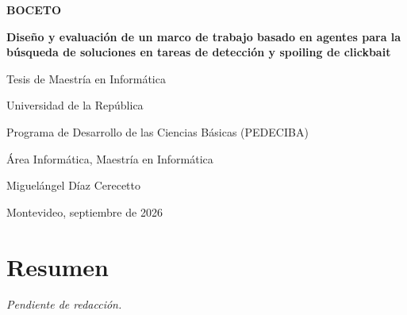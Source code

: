\documentclass[12pt,a4paper,oneside,openany]{book}
\begin{document}
\frontmatter

\begin{titlepage}
\centering
\vspace*{2.2cm}
{\Large\bfseries BOCETO\par}
\vspace{0.5cm}
{\Huge\bfseries Diseño y evaluación de un marco de trabajo basado en agentes para la búsqueda de soluciones en tareas de detección y spoiling de clickbait\par}
\vfill
{\large Tesis de Maestría en Informática\par}
\vspace{0.7cm}
{\large Universidad de la República\par}
{\large Programa de Desarrollo de las Ciencias Básicas (PEDECIBA)\par}
{\large Área Informática, Maestría en Informática\par}
\vspace{0.7cm}
{\large Miguelángel Díaz Cerecetto\par}
\vspace{0.8cm}
{\large Montevideo, septiembre de 2026\par}
\end{titlepage}

\chapter*{Resumen}
\emph{Pendiente de redacción.}

\tableofcontents

\mainmatter



\backmatter


\end{document}
